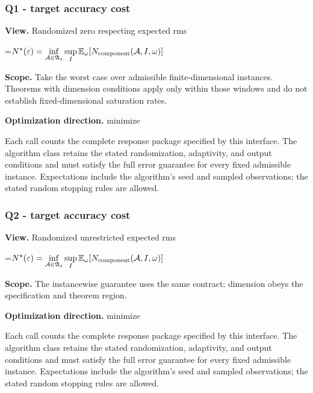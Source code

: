 \documentclass[10pt,a4paper]{article}
\newcommand{\AtlasMath}[1]{\par\begingroup\centering\setbox0=\hbox{$\displaystyle #1$}\ifdim\wd0>1.4\linewidth\typeout{ATLAS WIDE FORMULA: \the\wd0}\fi\ifdim\wd0>\linewidth\resizebox{\linewidth}{!}{\box0}\else\box0\fi\par\endgroup}
\begin{document}
\subsubsection{Q1 - target accuracy cost}


\textbf{View.} Randomized zero respecting expected rms



\AtlasMath{N^\star(\varepsilon)=\inf_{\mathcal A\in\mathfrak A_\varepsilon}\sup_I \mathbb E_\omega[N_{\rm component}(\mathcal A,I,\omega)]}


\textbf{Scope.} Take the worst case over admissible finite-dimensional instances. Theorems with dimension conditions apply only within those windows and do not establish fixed-dimensional saturation rates.



\textbf{Optimization direction.} minimize



Each call counts the complete response package specified by this interface. The algorithm class retains the stated randomization, adaptivity, and output conditions and must satisfy the full error guarantee for every fixed admissible instance. Expectations include the algorithm's seed and sampled observations; the stated random stopping rules are allowed.



\subsubsection{Q2 - target accuracy cost}


\textbf{View.} Randomized unrestricted expected rms



\AtlasMath{N^\star(\varepsilon)=\inf_{\mathcal A\in\mathfrak A_\varepsilon}\sup_I \mathbb E_\omega[N_{\rm component}(\mathcal A,I,\omega)]}


\textbf{Scope.} The instancewise guarantee uses the same contract; dimension obeys the specification and theorem region.



\textbf{Optimization direction.} minimize



Each call counts the complete response package specified by this interface. The algorithm class retains the stated randomization, adaptivity, and output conditions and must satisfy the full error guarantee for every fixed admissible instance. Expectations include the algorithm's seed and sampled observations; the stated random stopping rules are allowed.
\end{document}
